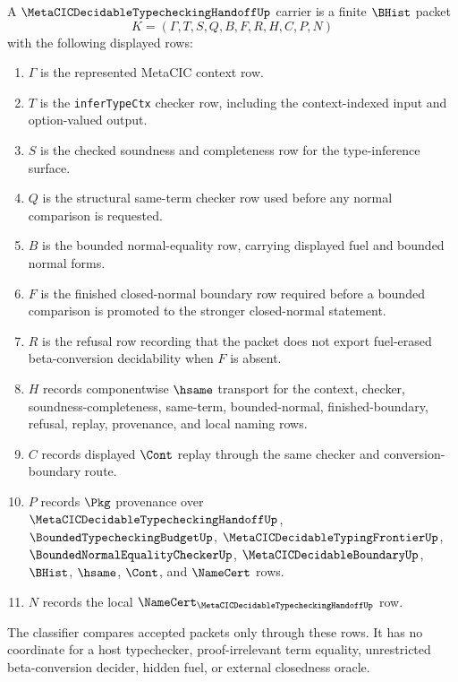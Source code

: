 \begin{definition}
\label{def:metacic-decidable-typechecking-handoff-carrier}
A $\MetaCICDecidableTypecheckingHandoffUp$ carrier is a finite $\BHist$ packet
$$
K=(\Gamma,T,S,Q,B,F,R,H,C,P,N)
$$
with the following displayed rows:
\begin{enumerate}
\item $\Gamma$ is the represented MetaCIC context row.
\item $T$ is the \texttt{inferTypeCtx} checker row, including the context-indexed input and option-valued output.
\item $S$ is the checked soundness and completeness row for the type-inference surface.
\item $Q$ is the structural same-term checker row used before any normal comparison is requested.
\item $B$ is the bounded normal-equality row, carrying displayed fuel and bounded normal forms.
\item $F$ is the finished closed-normal boundary row required before a bounded comparison is promoted to the stronger closed-normal statement.
\item $R$ is the refusal row recording that the packet does not export fuel-erased beta-conversion decidability when $F$ is absent.
\item $H$ records componentwise $\hsame$ transport for the context, checker, soundness-completeness, same-term, bounded-normal, finished-boundary, refusal, replay, provenance, and local naming rows.
\item $C$ records displayed $\Cont$ replay through the same checker and conversion-boundary route.
\item $P$ records $\Pkg$ provenance over $\MetaCICDecidableTypecheckingHandoffUp$, $\BoundedTypecheckingBudgetUp$, $\MetaCICDecidableTypingFrontierUp$, $\BoundedNormalEqualityCheckerUp$, $\MetaCICDecidableBoundaryUp$, $\BHist$, $\hsame$, $\Cont$, and $\NameCert$ rows.
\item $N$ records the local $\NameCert_{\MetaCICDecidableTypecheckingHandoffUp}$ row.
\end{enumerate}
The classifier compares accepted packets only through these rows. It has no coordinate for a host typechecker, proof-irrelevant term equality, unrestricted beta-conversion decider, hidden fuel, or external closedness oracle.
\end{definition}

